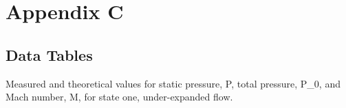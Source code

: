 \chapter{Appendix C}

\section{Data Tables} \label{sec:data_tables}

\begin{table}[htpb]
    \caption{Measured and theoretical values for static pressure, \gls{P}, total pressure, \gls{P_0}, and Mach number, \gls{M}, for state one, under-expanded flow.} \label{tab:state_1_data}
    \centering
    
\end{table}